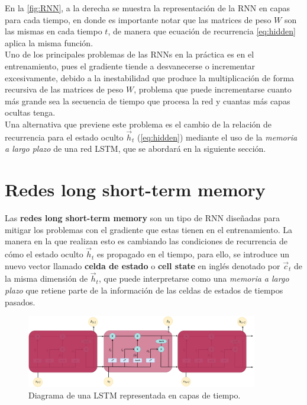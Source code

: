 En la \autoref{fig:RNN}, a la derecha se muestra la representación de la \acs{RNN} en capas para cada tiempo, en donde es importante notar que las matrices de peso $W$ son las mismas en cada tiempo $t$, de manera que ecuación de recurrencia \autoref{eq:hidden} aplica la misma función.
\\

Uno de los principales problemas de las \acs{RNN}s en la práctica es en el entrenamiento, pues el gradiente tiende a desvanecerse o incrementar excesivamente, debido a la inestabilidad que produce la multiplicación de forma recursiva de las matrices de peso $W$, problema que puede incrementarse cuanto más grande sea la secuencia de tiempo que procesa la red y cuantas más capas ocultas tenga. \cite{Nielsen:2018}
\\
Una alternativa que previene este problema es el cambio de la relación de recurrencia para el estado oculto $\vec{h}_t$ (\autoref{eq:hidden}) mediante el uso de la \emph{memoria a largo plazo} de una red \acs{LSTM}, que se abordará en la siguiente sección.

\section{Redes long short-term memory}\label{sec:lstm}

Las \textbf{redes long short-term memory} son un tipo de \acs{RNN} diseñadas para mitigar los problemas con el gradiente que estas tienen en el entrenamiento. La manera en la que realizan esto es cambiando las condiciones de recurrencia de cómo el estado oculto $\vec{h}_t$ es propagado en el tiempo, para ello, se introduce un nuevo vector llamado \textbf{celda de estado} o \textbf{cell state} en inglés denotado por $\vec{c}_{t}$ de la misma dimensión de $\vec{h}_t$, que puede interpretarse como una \emph{memoria a largo plazo} que retiene parte de la información de las celdas de estados de tiempos pasados. \cite{Nielsen:2018}

\begin{figure}[!htbp]
  \centering
  \includegraphics[width=0.9\textwidth]{./img/LSTM_layerS.drawio.png}
  \caption{Diagrama de una \acs{LSTM} representada en capas de tiempo.}
  \label{fig:LSTMlayerS}
\end{figure}

